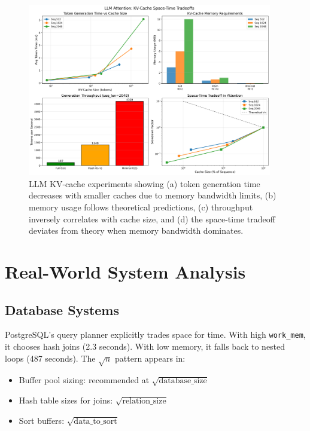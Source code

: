 \documentclass[11pt]{article}
\theoremstyle{definition}
\begin{document}
\begin{figure}[htbp]
\centering
\includegraphics[width=0.95\textwidth]{figures/llm_attention_tradeoff.png}
\caption{LLM KV-cache experiments showing (a) token generation time decreases with smaller caches due to memory bandwidth limits, (b) memory usage follows theoretical predictions, (c) throughput inversely correlates with cache size, and (d) the space-time tradeoff deviates from theory when memory bandwidth dominates.}
\label{fig:llm_tradeoff}
\end{figure}

\section{Real-World System Analysis}
\label{sec:systems}

\subsection{Database Systems}

PostgreSQL's query planner explicitly trades space for time. With high \texttt{work\_mem}, it chooses hash joins (2.3 seconds). With low memory, it falls back to nested loops (487 seconds). The $\sqrt{n}$ pattern appears in:
\begin{itemize}
\item Buffer pool sizing: recommended at $\sqrt{\text{database\_size}}$
\item Hash table sizes for joins: $\sqrt{\text{relation\_size}}$
\item Sort buffers: $\sqrt{\text{data\_to\_sort}}$
\end{itemize}
\end{document}
